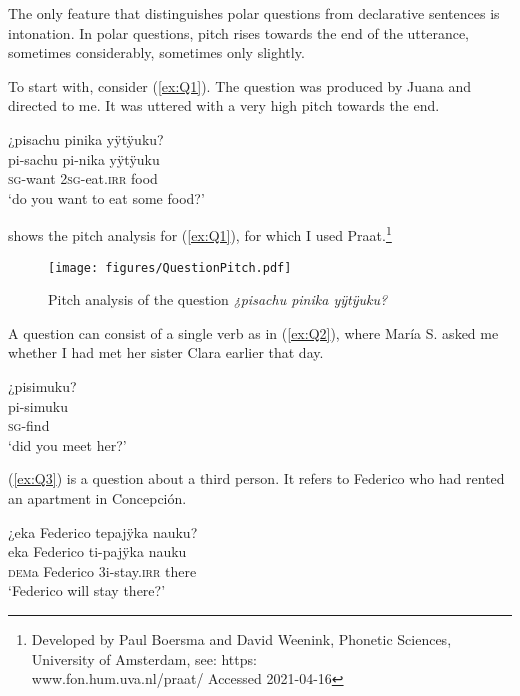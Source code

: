 The only feature that distinguishes polar questions from declarative sentences is intonation. In polar questions, pitch rises towards the end of the utterance, sometimes considerably, sometimes only slightly.


To start with, consider (\ref{ex:Q1}). The question was produced by Juana and directed to me. It was uttered with a very high pitch towards the end.

\ea\label{ex:Q1}
\begingl
\glpreamble ¿pisachu pinika yÿtÿuku?\\
\gla pi-sachu pi-nika yÿtÿuku\\
\textsc{sg}-want 2\textsc{sg}-eat.\textsc{irr} food\\
\glft ‘do you want to eat some food?’
\endgl
\trailingcitation{[jxx-d110923l-2.45]}
\xe

 shows the pitch analysis for (\ref{ex:Q1}), for which I used Praat.\footnote{Developed by Paul Boersma and David Weenink, Phonetic Sciences, University of Amsterdam, see: https:\\www.fon.hum.uva.nl/praat/ Accessed 2021-04-16}

\begin{figure}

\texttt{[image: figures/QuestionPitch.pdf]}
\caption{Pitch analysis of the question \textit{¿pisachu pinika yÿtÿuku?}}
\label{fig:pitch-Q}

\end{figure}


A question can consist of a single verb as in (\ref{ex:Q2}), where María S. asked me whether I had met her sister Clara earlier that day.

\largerpage
\ea\label{ex:Q2}
\begingl
\glpreamble ¿pisimuku?\\
\gla pi-simuku\\
\textsc{sg}-find\\
\glft ‘did you meet her?’
\endgl
\trailingcitation{[rxx-e120511l.083]}
\xe


(\ref{ex:Q3}) is a question about a third person. It refers to Federico who had rented an apartment in Concepción.

\ea\label{ex:Q3}
\begingl
\glpreamble ¿eka Federico tepajÿka nauku?\\
\gla eka Federico ti-pajÿka nauku\\
\glb \textsc{dem}a Federico 3i-stay.\textsc{irr} there\\
\glft ‘Federico will stay there?’
\endgl
\trailingcitation{[jxx-p110923l-1.089]}
\xe

